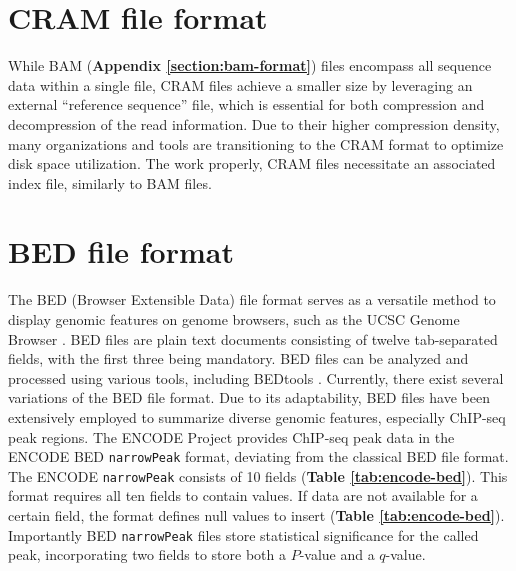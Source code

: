 \documentclass[a4paper, titlepage, openright]{book}
\begin{document}
\section{CRAM file format}\label{section:cram-format}
While BAM (\textbf{Appendix \ref{section:bam-format}}) files encompass all sequence data within a single file, CRAM files achieve a smaller size by leveraging an external ``reference sequence'' file, which is essential for both compression and decompression of the read information. Due to their higher compression density, many organizations and tools are transitioning to the CRAM format to optimize disk space utilization. The work properly, CRAM files necessitate an associated index file, similarly to BAM files.

\section{BED file format}\label{section:bed-format}
The BED (Browser Extensible Data) file format serves as a versatile method to display genomic features on genome browsers, such as the UCSC Genome Browser \citep{lee2020ucsc}. BED files are plain text documents consisting of twelve tab-separated fields, with the first three being mandatory. BED files can be analyzed and processed using various tools, including BEDtools \citep{quinlan2010bedtools}. Currently, there exist several variations of the BED file format. Due to its adaptability, BED files have been extensively employed to summarize diverse genomic features, especially ChIP-seq peak regions. The ENCODE Project provides ChIP-seq peak data in the ENCODE BED \texttt{narrowPeak} format, deviating from the classical BED file format. The ENCODE \texttt{narrowPeak} consists of 10 fields (\textbf{Table \ref{tab:encode-bed}}). This format requires all ten fields to contain values. If data are not available for a certain field, the format defines null values to insert (\textbf{Table \ref{tab:encode-bed}}). Importantly BED \texttt{narrowPeak} files store statistical significance for the called peak, incorporating two fields to store both a $P$-value and a $q$-value.
\end{document}
